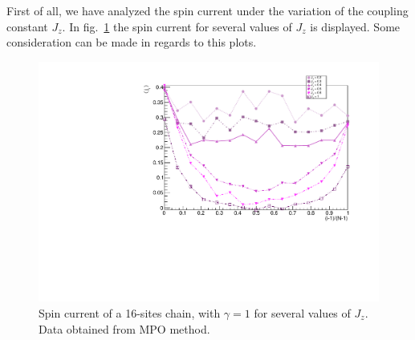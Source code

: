 First of all, we have analyzed the spin current under the variation of the coupling constant $J_z$. In fig.~\ref{fig:16sites_SpinCurrVaryingJz} the spin current for several values of $J_z$ is displayed. Some consideration can be made in regards to this plots.




\begin{figure}[H]
    \centering
    \includegraphics[scale=0.7]{Figures/16sites/16sites_SpinCurrVaryingJz.pdf}
    \captionsetup{width=1.\linewidth}
    \caption{Spin current of a 16-sites chain, with $\gamma = 1$ for several values of $J_z$. Data obtained from MPO method.}
    \label{fig:16sites_SpinCurrVaryingJz}
\end{figure}

